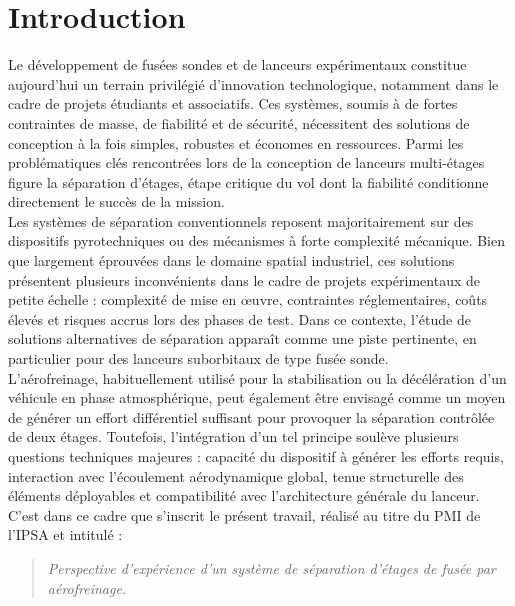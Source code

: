 \section*{Introduction}
\label{sec:introduction}

Le développement de fusées sondes et de lanceurs expérimentaux constitue aujourd’hui un terrain privilégié d’innovation
technologique, notamment dans le cadre de projets étudiants et associatifs. Ces systèmes, soumis à de fortes contraintes de
masse, de fiabilité et de sécurité, nécessitent des solutions de conception à la fois simples, robustes et économes en
ressources. Parmi les problématiques clés rencontrées lors de la conception de lanceurs multi-étages figure la séparation
d’étages, étape critique du vol dont la fiabilité conditionne directement le succès de la mission.\\

Les systèmes de séparation conventionnels reposent majoritairement sur des dispositifs pyrotechniques ou des mécanismes à forte
complexité mécanique. Bien que largement éprouvées dans le domaine spatial industriel, ces solutions présentent plusieurs
inconvénients dans le cadre de projets expérimentaux de petite échelle : complexité de mise en œuvre, contraintes
réglementaires, coûts élevés et risques accrus lors des phases de test. Dans ce contexte, l’étude de solutions alternatives de
séparation apparaît comme une piste pertinente, en particulier pour des lanceurs suborbitaux de type fusée sonde.\\

L’aérofreinage, habituellement utilisé pour la stabilisation ou la décélération d’un véhicule en phase atmosphérique, peut
également être envisagé comme un moyen de générer un effort différentiel suffisant pour provoquer la séparation contrôlée de deux
étages. Toutefois, l’intégration d’un tel principe soulève plusieurs questions techniques majeures : capacité du dispositif à
générer les efforts requis, interaction avec l’écoulement aérodynamique global, tenue structurelle des éléments déployables et
compatibilité avec l’architecture générale du lanceur.\\

C’est dans ce cadre que s’inscrit le présent travail, réalisé au titre du \acrfull{PMI} de l’\acrfull{IPSA} et intitulé :

\begin{quote}
    \centering
    \textit{\og{}Perspective d’expérience d’un système de séparation d’étages de fusée par aérofreinage.\fg{}}
\end{quote}

